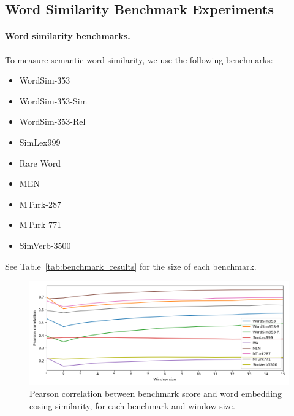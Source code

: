\documentclass[11pt,a4paper]{article}
\begin{document}
    
    
    \subsection{Word Similarity Benchmark Experiments}\label{sec:benchmark_exp}
    
    \paragraph{Word similarity benchmarks.}
    
    To measure semantic word similarity, we use the following benchmarks:
    \begin{itemize}
        \item WordSim-353~\cite{finkelstein2001placing}
        \item WordSim-353-Sim~\cite{agirre2009study}
        \item WordSim-353-Rel~\cite{zesch2008using}
        \item SimLex999~\cite{hill2015simlex}
        \item Rare Word~\cite{luong2013better}
        \item MEN~\cite{bruni2012distributional}
        \item MTurk-287~\cite{radinsky2011word}
        \item MTurk-771~\cite{halawi2012large}
        \item SimVerb-3500~\cite{Gerz2016emnlp}
    \end{itemize}
    See Table~\ref{tab:benchmark_results} for the size of each benchmark.
    
    \begin{figure}[ht]
        \includegraphics[width=\textwidth]{figs/distances_fasttext_enwiki-20170501-clean_cbow-300d-min500_eval.png}
	    \caption{Pearson correlation between benchmark score and word embedding cosing similarity,
	    for each benchmark and window size.
	    \label{fig:nn_pos_hist}}
	\end{figure}
\end{document}
